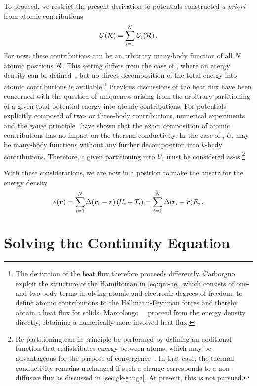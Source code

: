 To proceed, we restrict the present derivation to potentials constructed \emph{a priori} from atomic contributions
\begin{equation}
	U(\Rgen) = \sum_{i=1}^N U_i(\Rgen) \, . \label{eq:hf_u_gen}
\end{equation}
For now, these contributions can be an arbitrary many-body function of all $N$ atomic positions $\mathcal{R}$.
This setting differs from the case of \dft, where an energy density can be defined~\cite{cm1992t}, but no direct decomposition of the total energy into atomic contributions is available.\footnote[][]{The derivation of the heat flux therefore proceeds differently. Carborgno~\etal~\cite{crs2017t} exploit the structure of the Hamiltonian in \cref{eq:qm-he}, which consists of one- and two-body terms involving atomic and electronic degrees of freedom, to define atomic contributions to the Hellmann-Feynman forces and thereby obtain a heat flux for solids. Marcolongo~\etal~\cite{mub2016t} proceed from the energy density directly, obtaining a numerically more involved heat flux.}
Previous discussions of the heat flux have been concerned with the question of uniqueness arising from the arbitrary partitioning of a given total potential energy into atomic contributions.
For potentials explicitly composed of two- or three-body contributions, numerical experiments~\cite{h2012t} and the gauge principle~\cite{emub2016t} have shown that the exact composition of atomic contributions has no impact on the thermal conductivity.
In the case of \mlps, $U_i$ may be many-body functions without any further decomposition into $k$-body contributions.
Therefore, a given partitioning into $U_i$ must be considered as-is.\footnote{Re-partitioning can in principle be performed by defining an additional function that redistributes energy between atoms, which may be advantageous for the purpose of \gk convergence~\cite{meb2020t}. In that case, the thermal conductivity remains unchanged if such a change corresponds to a non-diffusive flux as discussed in \cref{sec:gk-gauge}. At present, this is not pursued.}

With these considerations, we are now in a position to make the ansatz for the energy density
\begin{equation}
	e(\boldsymbol{r}) = \sum_{i=1}^N \Delta(\boldsymbol{r}_i - \boldsymbol{r}) \left(U_i + T_i\right) = \sum_{i=1}^N \Delta(\boldsymbol{r}_i - \boldsymbol{r}) E_i \, .
\end{equation}


\section{Solving the Continuity Equation}
\label{sec:hf_ceqn}

